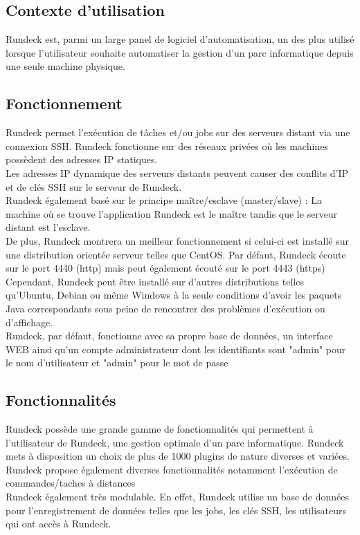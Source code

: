 \documentclass[12pt]{article}
\begin{document}
\subsection{Contexte d'utilisation}

Rundeck est, parmi un large panel de logiciel d'automatisation, un des plus utilisé lorsque l'utilisateur souhaite automatiser la gestion d'un parc informatique depuis une seule machine physique.

\subsection{Fonctionnement}

Rundeck permet l'exécution de tâches et/ou jobs sur des serveurs distant via une connexion SSH. Rundeck fonctionne sur des réseaux privées où les machines possèdent des adresses IP statiques. 
\\
Les adresses IP dynamique des serveurs distants peuvent causer des conflits d'IP et de clés SSH sur le serveur de Rundeck.
\\
Rundeck également basé sur le principe maître/esclave (master/slave) : La machine où se trouve l'application Rundeck est le maître tandis que le serveur distant est l'esclave. 
\\
De plus, Rundeck montrera un meilleur fonctionnement si celui-ci est installé sur une distribution orientée serveur telles que CentOS. Par défaut, Rundeck écoute sur le port 4440 (http) mais peut également écouté sur le port 4443 (https)
\\
Cependant, Rundeck peut être installé sur d'autres distributions telles qu'Ubuntu, Debian ou même Windows à la seule conditions d'avoir les paquets Java correspondants sous peine de rencontrer des problèmes d'exécution ou d'affichage.
\\
Rundeck, par défaut, fonctionne avec sa propre base de données, un interface WEB ainsi qu'un compte administrateur dont les identifiants sont "admin" pour le nom d'utilisateur et "admin" pour le mot de passe

\subsection{Fonctionnalités}

Rundeck possède une grande gamme de fonctionnalités qui permettent à l'utilisateur de Rundeck, une gestion optimale d'un parc informatique. Rundeck mets à disposition un choix de plus de 1000 plugins de nature diverses et variées. 
\\
Rundeck propose également diverses fonctionnalités notamment l'exécution de commandes/taches à distances
\\
Rundeck également très modulable. En effet, Rundeck utilise un base de données pour l'enregistrement de données telles que les jobs, les clés SSH, les utilisateurs qui ont accès à Rundeck.
\end{document}
